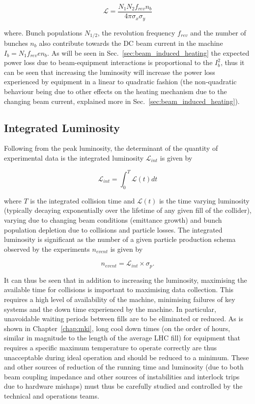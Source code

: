 \begin{equation}
\mathcal{L} = \frac{N_{1} N_{2} f_{rev} n_{b}}{4 \pi \sigma_{x} \sigma_{y}}
\end{equation}

where. Bunch populations $N_{1/2}$, the revolution frequency $f_{rev}$ and the number of bunches $n_{b}$ also contribute towards the DC beam current in the machine $I_{b} = N_{1} f_{rev} e n_{b}$. As will be seen in Sec.~\ref{sec:beam_induced_heating} the expected power loss due to beam-equipment interactions is proportional to the $I_{b}^{2}$, thus it can be seen that increasing the luminosity will increase the power loss experienced by equipment in a linear to quadratic fashion (the non-quadratic behaviour being due to other effects on the heating mechanism due to the changing beam current, explained more in Sec.~\ref{sec:beam_induced_heating}).

\subsection{Integrated Luminosity}

Following from the peak luminosity, the determinant of the quantity of experimental data is the integrated luminosity $\mathcal{L}_{int}$ is given by

\begin{equation}
\mathcal{L}_{int} = \int^{T}_{0} \mathcal{L} \left( t \right) dt
\end{equation}

where $T$ is the integrated collision time and $\mathcal{L} (t)$ is the time varying luminosity (typically decaying exponentially over the lifetime of any given fill of the collider\cite{McCrory:lumiEvo}), varying due to changing beam conditions (emittance growth) and bunch population depletion due to collisions and particle losses. The integrated luminosity is significant as the number of a given particle production schema observed by the experiments $n_{event}$ is given by

\begin{equation}
n_{event} = \mathcal{L}_{int} \times \sigma_{p}.
\end{equation}

It can thus be seen that in addition to increasing the luminosity, maximising the available time for collisions is important to maximising data collection. This requires a high level of availability of the machine, minimising failures of key systems and the down time experienced by the machine. In particular, unavoidable waiting periods between fills are to be eliminated or reduced. As is shown in Chapter~\ref{chap:mki}, long cool down times (on the order of hours, similar in magnitude to the length of the average LHC fill) for equipment that requires a specific maximum temperature to operate correctly are thus unacceptable during ideal operation and should be reduced to a minimum. These and other sources of reduction of the running time and luminosity (due to both beam coupling impedance and other sources of instabilities and interlock trips due to hardware mishaps) must thus be carefully studied and controlled by the technical and operations teams.

